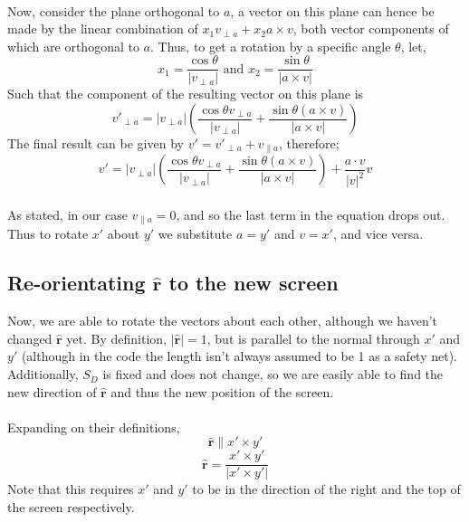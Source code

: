 \documentclass{article}
\newcommand\ru{\hat{\mathbf{r}}\xspace}
\newcommand\proj[2]{\frac{#1 \cdot #2}{\left|#2\right|^2} #2}
\newcommand\xp{x\prime\xspace}
\newcommand\yp{y\prime\xspace}
\newcommand\vp{v\prime\xspace}
\begin{document}
	\paragraph{}
	Now, consider the plane orthogonal to $a$, a vector on this plane can hence be made by the linear combination of
	$x_1 v_{\perp a} + x_2 a \times v$, both vector components of which are orthogonal to $a$.
	Thus, to get a rotation by a specific angle $\theta$, let,
	$$x_1 = \frac{\cos{\theta}}{\left| v_{\perp a} \right|} \text{   and   } x_2 = \frac{\sin{\theta}}{\left| a \times v \right|}$$
	Such that the component of the resulting vector on this plane is
	$$\vp_{\perp a} = \left|v_{\perp a} \right| \left( \frac{\cos{\theta} v_{\perp a}}{\left| v_{\perp a} \right|}
					+ \frac{\sin{\theta} (a \times v)}{\left|a \times v\right|}\right) $$
	The final result can be given by $\vp = \vp_{\perp a} + v_{\parallel a}$, therefore;
	\begin{equation}
	\vp =  \left|v_{\perp a} \right| \left( \frac{\cos{\theta} v_{\perp a}}{\left| v_{\perp a} \right|}
					+ \frac{\sin{\theta} (a \times v)}{\left|a \times v\right|}\right) + \proj{a}{v}
	\end{equation}
	\paragraph{}
	As stated, in our case $v_{\parallel a} = 0$, and so the last term in the equation drops out.
	Thus to rotate $\xp$ about $\yp$ we substitute $a = \yp$ and $v = \xp$, and vice versa.

\subsection{Re-orientating $\ru$ to the new screen}

Now, we are able to rotate the vectors about each other, although we haven't changed $\ru$ yet. By definition, $|\ru| = 1$, but is parallel to the normal through $\xp$ and $\yp$ (although in the code the length isn't always assumed to be 1 as a safety net).
	Additionally, $S_D$ is fixed and does not change, so we are easily able to find the new direction of $\ru$ and thus the new position of the screen.
	\paragraph{}
	Expanding on their definitions,
	$$\ru \parallel \xp \times \yp$$
	$$\ru = \frac{\xp \times \yp}{\left|\xp \times \yp\right|}$$
	Note that this requires $\xp$ and $\yp$ to be in the direction of the right and the top of the screen respectively.
\end{document}

